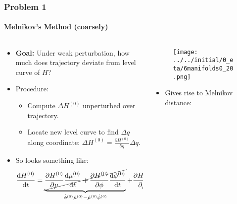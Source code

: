 \documentclass[dvipsnames, 11pt]{beamer}
\newcommand*{\rd}[2]{\frac{\mathrm{d}#1}{\mathrm{d}#2}}
\newcommand*{\pd}[2]{\frac{\partial#1}{\partial#2}}
\begin{document}
\begin{frame}
    \frametitle{Problem 1}
    \framesubtitle{Melnikov's Method (coarsely)}

    \begin{columns}
        \begin{column}{0.5\textwidth}
            \begin{itemize}
                \item \textbf{Goal:} Under weak perturbation, how much does
                    trajectory deviate from level curve of $H$?

                \item Procedure:

                    \begin{itemize}
                        \item Compute $\Delta H^{(0)}$ unperturbed  over
                            trajectory.

                        \item Locate new level curve to find $\Delta q$ along
                            coordinate: $\Delta H^{(0)} =
                            \pd{H^{(0)}}{q}\Delta q$.
                    \end{itemize}
                \item So looks something like:
                    {\tiny
                    \begin{equation*}
                        \rd{H^{(0)}}{t} =
                            \underbrace{
                            \cancel{\pd{H^{(0)}}{\mu}\rd{\mu^{(0)}}{t}
                                + \pd{H^{(0)}}{\phi}\rd{\phi^{(0)}}{t}}}
                                _{\dot{\phi}^{(0)}\dot{\mu}^{(0)}
                                    - \dot{\mu}^{(0)}\dot{\phi}^{(0)}}
                            + \pd{H^{(0)}}{\mu} \rd{\mu^{(1)}}{t}.
                    \end{equation*}}
            \end{itemize}
        \end{column}
        \begin{column}{0.5\textwidth}
            \begin{figure}[t]
                \centering
                \texttt{[image: ../../initial/0\_eta/6manifolds0\_20.png]}
            \end{figure}
            \begin{itemize}
                \item Gives rise to Melnikov distance:


\end{itemize}
\end{column}
\end{columns}
\end{frame}
\end{document}
